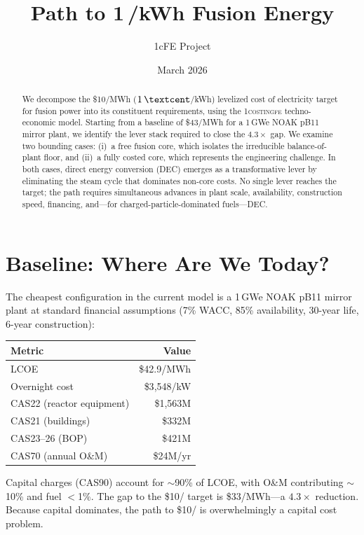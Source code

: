 \documentclass[11pt,a4paper]{article}
\title{Path to 1\,\textcent/kWh Fusion Energy}
\author{1cFE Project}
\date{March 2026}
\newcommand{\target}{\$10/\text{MWh}}
\begin{document}
\maketitle

\begin{abstract}
We decompose the \$10/MWh ($1\,\textcent$/kWh) levelized cost of
electricity target for fusion power into its constituent requirements,
using the \textsc{1costingfe} techno-economic model.  Starting from a
baseline of \$43/MWh for a 1\,GWe NOAK pB11 mirror plant, we identify
the lever stack required to close the $4.3\times$ gap.  We examine two
bounding cases: (i)~a free fusion core, which isolates the irreducible
balance-of-plant floor, and (ii)~a fully costed core, which represents
the engineering challenge.  In both cases, direct energy conversion
(DEC) emerges as a transformative lever by eliminating the steam cycle
that dominates non-core costs.  No single lever reaches the target;
the path requires simultaneous advances in plant scale, availability,
construction speed, financing, and---for charged-particle-dominated
fuels---DEC.
\end{abstract}

\tableofcontents


\section{Baseline: Where Are We Today?}

The cheapest configuration in the current model is a 1\,GWe NOAK pB11
mirror plant at standard financial assumptions (7\% WACC, 85\%
availability, 30-year life, 6-year construction):

\begin{center}
\begin{tabular}{lr}
\toprule
Metric & Value \\
\midrule
LCOE & \$42.9/MWh \\
Overnight cost & \$3{,}548/kW \\
CAS22 (reactor equipment) & \$1{,}563M \\
CAS21 (buildings) & \$332M \\
CAS23--26 (BOP) & \$421M \\
CAS70 (annual O\&M) & \$24M/yr \\
\bottomrule
\end{tabular}
\end{center}

Capital charges (CAS90) account for $\sim$90\% of LCOE, with O\&M
contributing $\sim$10\% and fuel $<$1\%.  The gap to the \target{}
target is \$33/MWh---a $4.3\times$ reduction.  Because capital
dominates, the path to \target{} is overwhelmingly a capital cost
problem.
\end{document}
